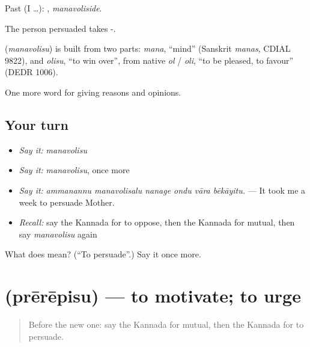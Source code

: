 Past (I …): , \emph{manavoliside}.

The person persuaded takes -.

\begin{cousinweb}
\textbf{} (\emph{manavolisu}) is built from two parts: \emph{mana}, \textquotedblleft{}mind\textquotedblright{} (Sanskrit \emph{manas}, CDIAL 9822), and \emph{olisu}, \textquotedblleft{}to win over\textquotedblright{}, from native \emph{ol} / \emph{oli}, \textquotedblleft{}to be pleased, to favour\textquotedblright{} (DEDR 1006).
\end{cousinweb}

\begin{grammarlens}[title={What you've built}]
One more word for giving reasons and opinions.
\end{grammarlens}

\subsection*{Your turn}
\begin{itemize}
\raggedright
  \item \emph{Say it:} \emph{manavolisu}
  \item \emph{Say it:} \emph{manavolisu}, once more
  \item \emph{Say it:} \emph{ammanannu manavolisalu nanage ondu vāra bēkāyitu.} — It took me a week to persuade Mother.
  \item \emph{Recall:} say the Kannada for to oppose, then the Kannada for mutual, then say \emph{manavolisu} again
\end{itemize}

\begin{tcolorbox}[breakable,colback=teal!4,colframe=teal!35!black,title={Before you move on}]
What does  mean? (\textquotedblleft{}To persuade\textquotedblright{}.) Say it once more.
\end{tcolorbox}
\section[\texorpdfstring{\kn{ಪ್ರೇರೇಪಿಸು} (prērēpisu)}{ಪ್ರೇರೇಪಿಸು (prērēpisu)}]{ (prērēpisu) — to motivate; to urge}

\label{lesson:KA-C380-prerepisu}



\begin{quote}
Before the new one: say the Kannada for mutual, then the Kannada for to persuade.
\end{quote}

